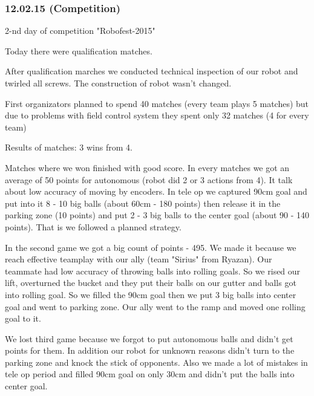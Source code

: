 \subsubsection{12.02.15 (Competition)}
\begin{center}
	2-nd day of competition "Robofest-2015"
\end{center}
Today there were qualification matches. \newline

After qualification marches we conducted technical inspection of our robot and twirled all screws. The construction of robot wasn't changed.\newline

First organizators planned to spend 40 matches (every team plays 5 matches) but due to problems with field control system they spent only 32 matches (4 for every team) \newline
 
Results of matches: 3 wins from 4.\newline

Matches where we won finished with good score. In every matches we got an average of 50 points for autonomous (robot did 2 or 3 actions from 4). It talk about low accuracy of moving by encoders. In tele op we captured 90cm goal and put into it 8 - 10 big balls (about 60cm - 180 points) then release it in the parking zone (10 points) and put 2 - 3 big balls to the center goal (about 90 - 140 points). That is we followed a planned strategy. \newline

In the second game we got a big count of points - 495. We made it because we reach effective teamplay with our ally (team "Sirius" from Ryazan). Our teammate had low accuracy of throwing balls into rolling goals. So we rised our lift, overturned the bucket and they put their balls on our gutter and balls got into rolling goal. So we filled the 90cm goal then we put 3 big balls into center goal and went to parking zone. Our ally went to the ramp and moved one rolling goal to it.\newline

We lost third game because we forgot to put autonomous balls and didn't get points for them. In addition our robot for unknown reasons didn't turn to the parking zone and knock the stick of opponents. Also we made a lot of mistakes in tele op period and filled 90cm goal on only 30cm and didn't put the balls into center goal.\newline

